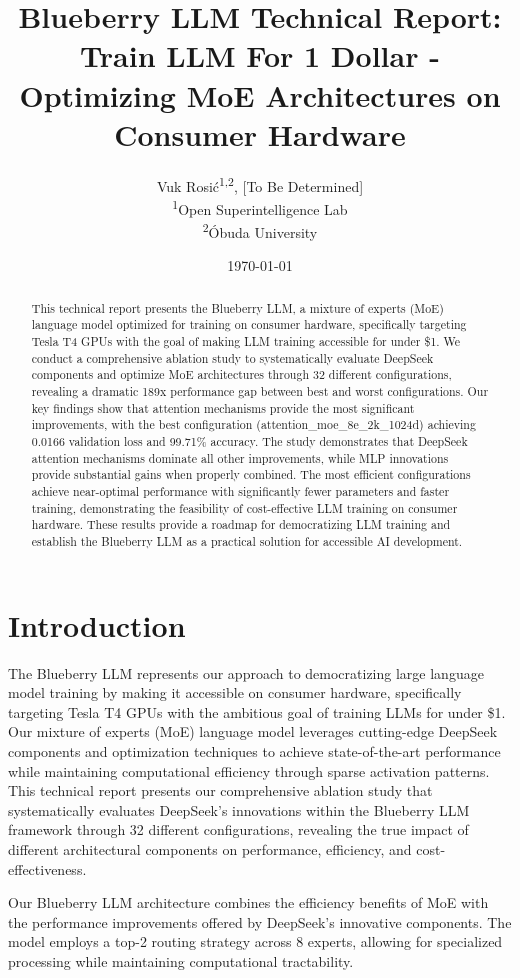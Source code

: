 \documentclass[11pt,a4paper]{article}
\title{Blueberry LLM Technical Report: Train LLM For 1 Dollar - Optimizing MoE Architectures on Consumer Hardware}
\author{
    Vuk Rosić\textsuperscript{1,2}, [To Be Determined] \\
    \textsuperscript{1}Open Superintelligence Lab \\
    \textsuperscript{2}Óbuda University
}
\date{\today}
\begin{document}
\maketitle

\begin{abstract}
This technical report presents the Blueberry LLM, a mixture of experts (MoE) language model optimized for training on consumer hardware, specifically targeting Tesla T4 GPUs with the goal of making LLM training accessible for under \$1. We conduct a comprehensive ablation study to systematically evaluate DeepSeek components and optimize MoE architectures through 32 different configurations, revealing a dramatic 189x performance gap between best and worst configurations. Our key findings show that attention mechanisms provide the most significant improvements, with the best configuration (attention\_moe\_8e\_2k\_1024d) achieving 0.0166 validation loss and 99.71\% accuracy. The study demonstrates that DeepSeek attention mechanisms dominate all other improvements, while MLP innovations provide substantial gains when properly combined. The most efficient configurations achieve near-optimal performance with significantly fewer parameters and faster training, demonstrating the feasibility of cost-effective LLM training on consumer hardware. These results provide a roadmap for democratizing LLM training and establish the Blueberry LLM as a practical solution for accessible AI development.
\end{abstract}

\section{Introduction}

The Blueberry LLM represents our approach to democratizing large language model training by making it accessible on consumer hardware, specifically targeting Tesla T4 GPUs with the ambitious goal of training LLMs for under \$1. Our mixture of experts (MoE) language model leverages cutting-edge DeepSeek components and optimization techniques to achieve state-of-the-art performance while maintaining computational efficiency through sparse activation patterns. This technical report presents our comprehensive ablation study that systematically evaluates DeepSeek's innovations within the Blueberry LLM framework through 32 different configurations, revealing the true impact of different architectural components on performance, efficiency, and cost-effectiveness.

Our Blueberry LLM architecture combines the efficiency benefits of MoE with the performance improvements offered by DeepSeek's innovative components. The model employs a top-2 routing strategy across 8 experts, allowing for specialized processing while maintaining computational tractability.
\end{document}
